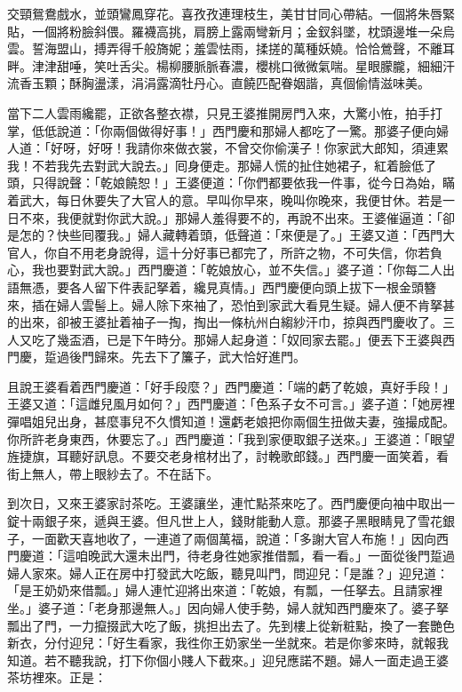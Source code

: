 \begin{myquote} 
交頸鴛鴦戲水，並頭鸞鳳穿花。喜孜孜連理枝生，美甘甘同心帶結。一個將朱唇緊貼，一個將粉臉斜偎。羅襪高挑，肩膀上露兩彎新月；金釵斜墜，枕頭邊堆一朵烏雲。{}誓海盟山，搏弄得千般旖妮；羞雲怯雨，揉搓的萬種妖嬈。恰恰鶯聲，不離耳畔。津津甜唾，笑吐舌尖。楊柳腰脈脈春濃，櫻桃口微微氣喘。星眼朦朧，細細汗流香玉顆；酥胸盪漾，涓涓露滴牡丹心。直饒匹配眷姻諧，真個偷情滋味美。
\end{myquote} 

當下二人雲雨纔罷，正欲各整衣襟，只見王婆推開房門入來，大驚小恠，拍手打掌，低低說道：{}「你兩個做得好事！」西門慶和那婦人都吃了一驚。那婆子便向婦人道：「好呀，好呀！我請你來做衣裳，不曾交你偷漢子！{}你家武大郎知，須連累我！不若我先去對武大說去。」囘身便走。那婦人慌的扯住她裙子，紅着臉低了頭，只得說聲：「乾娘饒恕！」{}王婆便道：「你們都要依我一件事，從今日為始，瞞着武大，每日休要失了大官人的意。早叫你早來，晚叫你晚來，我便甘休。若是一日不來，我便就對你武大說。」那婦人羞得要不的，再說不出來。王婆催逼道：「卻是怎的？快些囘覆我。」婦人藏轉着頭，低聲道：「來便是了。」王婆又道：「西門大官人，你自不用老身說得，這十分好事已都完了，所許之物，不可失信，{}你若負心，我也要對武大說。」西門慶道：「乾娘放心，並不失信。」婆子道：「你每二人出語無憑，要各人留下件表記拏着，纔見真情。」西門慶便向頭上拔下一根金頭簪來，插在婦人雲髻上。婦人除下來袖了，恐怕到家武大看見生疑。婦人便不肯拏甚的出來，卻被王婆扯着袖子一掏，掏出一條杭州白縐紗汗巾，掠與西門慶收了。{}三人又吃了幾盃酒，已是下午時分。那婦人起身道：「奴囘家去罷。」便丟下王婆與西門慶，踅過後門歸來。先去下了簾子，武大恰好進門。

且說王婆看着西門慶道：「好手段麼？」西門慶道：「端的虧了乾娘，真好手段！」王婆又道：「這雌兒風月如何？」西門慶道：「色系子女不可言。」婆子道：「她房裡彈唱姐兒出身，甚麼事兒不久慣知道！還虧老娘把你兩個生扭做夫妻，強撮成配。你所許老身東西，休要忘了。」西門慶道：「我到家便取銀子送來。」王婆道：「眼望旌捷旗，耳聽好訊息。不要交老身棺材出了，討輓歌郎錢。」{}西門慶一面笑着，看街上無人，帶上眼紗去了。不在話下。

到次日，又來王婆家討茶吃。王婆讓坐，連忙點茶來吃了。西門慶便向袖中取出一錠十兩銀子來，遞與王婆。但凡世上人，錢財能動人意。那婆子黑眼睛見了雪花銀子，一面歡天喜地收了，一連道了兩個萬福，說道：「多謝大官人布施！」{}因向西門慶道：「這咱晚武大還未出門，待老身徃她家推借瓢，看一看。」一面從後門踅過婦人家來。婦人正在房中打發武大吃飯，聽見叫門，問迎兒：「是誰？」迎兒道：「是王奶奶來借瓢。」婦人連忙迎將出來道：「乾娘，有瓢，一任拏去。且請家裡坐。」婆子道：「老身那邊無人。」因向婦人使手勢，婦人就知西門慶來了。{}婆子拏瓢出了門，一力攛掇武大吃了飯，挑担出去了。先到樓上從新粧點，換了一套艷色新衣，分付迎兒：「好生看家，我徃你王奶家坐一坐就來。若是你爹來時，就報我知道。若不聽我說，打下你個小賤人下截來。」迎兒應諾不題。婦人一面走過王婆茶坊裡來。正是：

